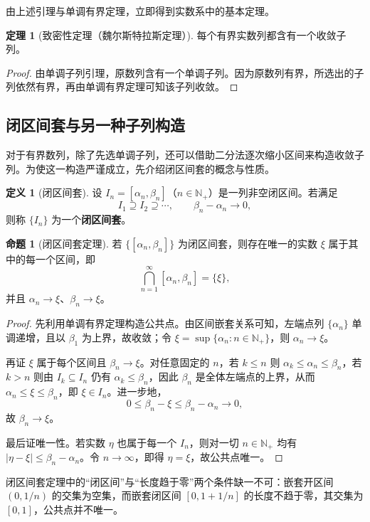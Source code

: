 \documentclass[UTF8, fontset=fandol, a4paper, 12pt]{ctexart}
\newcommand{\Nplus}{\mathbb N_{+}}
\theoremstyle{definition}
\newtheorem*{definition}{定义}
\newtheorem{theorem}{定理}
\newtheorem*{proposition}{命题}
\begin{document}
由上述引理与单调有界定理，立即得到实数系中的基本定理。

\begin{theorem}[致密性定理（魏尔斯特拉斯定理）]
每个有界实数列都含有一个收敛子列。
\end{theorem}
\begin{proof}
由单调子列引理，原数列含有一个单调子列。因为原数列有界，所选出的子列依然有界，再由单调有界定理可知该子列收敛。
\end{proof}

\subsection*{闭区间套与另一种子列构造}
对于有界数列，除了先选单调子列，还可以借助二分法逐次缩小区间来构造收敛子列。为使这一构造严谨成立，先介绍闭区间套的概念与性质。

\begin{definition}[闭区间套]
设 $I_n=[\alpha_n,\beta_n]$（$n\in\Nplus$）是一列非空闭区间。若满足
\[
I_1\supseteq I_2\supseteq\cdots,\qquad
\beta_n-\alpha_n\longrightarrow0,
\]
则称 $\{I_n\}$ 为一个\textbf{闭区间套}。
\end{definition}

\begin{proposition}[闭区间套定理]
若 $\{[\alpha_n,\beta_n]\}$ 为闭区间套，则存在唯一的实数 $\xi$
属于其中的每一个区间，即
\[
\bigcap_{n=1}^{\infty}[\alpha_n,\beta_n]=\{\xi\},
\]
并且 $\alpha_n\to\xi$、$\beta_n\to\xi$。
\end{proposition}
\begin{proof}
先利用单调有界定理构造公共点。由区间嵌套关系可知，左端点列 $\{\alpha_n\}$ 单调递增，且以 $\beta_1$ 为上界，故收敛；令 $\xi=\sup\{\alpha_n:n\in\Nplus\}$，则 $\alpha_n\to\xi$。

再证 $\xi$ 属于每个区间且 $\beta_n\to\xi$。对任意固定的 $n$，若 $k\le n$ 则 $\alpha_k\le\alpha_n\le\beta_n$，若 $k>n$ 则由 $I_k\subseteq I_n$ 仍有 $\alpha_k\le\beta_n$，因此 $\beta_n$ 是全体左端点的上界，从而 $\alpha_n\le\xi\le\beta_n$，即 $\xi\in I_n$。进一步地，
\[
0\le\beta_n-\xi\le\beta_n-\alpha_n\longrightarrow0,
\]
故 $\beta_n\to\xi$。

最后证唯一性。若实数 $\eta$ 也属于每一个 $I_n$，则对一切 $n\in\Nplus$ 均有 $|\eta-\xi|\le\beta_n-\alpha_n$。令 $n\to\infty$，即得 $\eta=\xi$，故公共点唯一。
\end{proof}

闭区间套定理中的“闭区间”与“长度趋于零”两个条件缺一不可：嵌套开区间 $(0,1/n)$ 的交集为空集，而嵌套闭区间 $[0,1+1/n]$ 的长度不趋于零，其交集为 $[0,1]$，公共点并不唯一。
\end{document}
